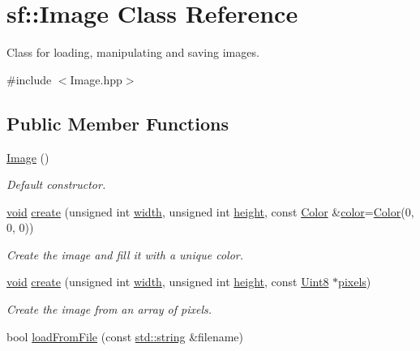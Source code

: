 \hypertarget{classsf_1_1_image}{\section{sf\-:\-:Image Class Reference}
\label{classsf_1_1_image}
}


Class for loading, manipulating and saving images.  




{\ttfamily \#include $<$Image.\-hpp$>$}

\subsection*{Public Member Functions}
\begin{DoxyCompactItemize}
\item 
\hyperlink{classsf_1_1_image_abb4caf3cb167b613345ebe36fc883f12}{Image} ()
\begin{DoxyCompactList}\small\item\em Default constructor. \end{DoxyCompactList}\item 
\hyperlink{glutf90_8h_ac778d6f63f1aaf8ebda0ce6ac821b56e}{void} \hyperlink{classsf_1_1_image_a2a67930e2fd9ad97cf004e918cf5832b}{create} (unsigned int \hyperlink{gl3_8h_a9d14ddc31c6c8b61f3fe3679ab976133}{width}, unsigned int \hyperlink{gl3_8h_a67001679ebf2bb0ba972db4d29c6550c}{height}, const \hyperlink{classsf_1_1_color}{Color} \&\hyperlink{gl3_8h_a3ea846f998d64f079b86052b6c4193a8}{color}=\hyperlink{classsf_1_1_color}{Color}(0, 0, 0))
\begin{DoxyCompactList}\small\item\em Create the image and fill it with a unique color. \end{DoxyCompactList}\item 
\hyperlink{glutf90_8h_ac778d6f63f1aaf8ebda0ce6ac821b56e}{void} \hyperlink{classsf_1_1_image_a1c2b960ea12bdbb29e80934ce5268ebf}{create} (unsigned int \hyperlink{gl3_8h_a9d14ddc31c6c8b61f3fe3679ab976133}{width}, unsigned int \hyperlink{gl3_8h_a67001679ebf2bb0ba972db4d29c6550c}{height}, const \hyperlink{namespacesf_a4ef3d630785c4f296f9b4f274c33d78e}{Uint8} $\ast$\hyperlink{gl3_8h_ada7ad693ea2e311b8103f4693fc35f80}{pixels})
\begin{DoxyCompactList}\small\item\em Create the image from an array of pixels. \end{DoxyCompactList}\item 
bool \hyperlink{classsf_1_1_image_a9e4f2aa8e36d0cabde5ed5a4ef80290b}{load\-From\-File} (const \hyperlink{gl3_8h_ac83513893df92266f79a515488701770}{std\-::string} \&filename)

\end{DoxyCompactItemize}
